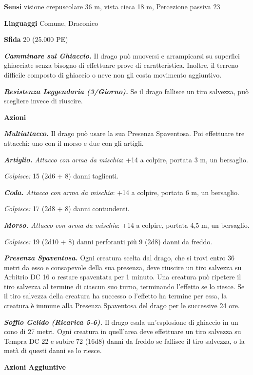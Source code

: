 \begin{multicols}{2}
\textbf{Sensi} visione crepuscolare 36 m, vista cieca 18 m, Percezione passiva
23

\textbf{Linguaggi} Comune, Draconico

\textbf{Sfida} 20 (25.000 PE)

\emph{\textbf{Camminare sul Ghiaccio.}} Il drago può muoversi e
arrampicarsi su superfici ghiacciate senza bisogno di effettuare prove
di caratteristica. Inoltre, il terreno difficile composto di ghiaccio o
neve non gli costa movimento aggiuntivo.

\emph{\textbf{Resistenza Leggendaria (3/Giorno).}} Se il drago fallisce
un tiro salvezza, può scegliere invece di riuscire.

\textbf{Azioni}

\emph{\textbf{Multiattacco.}} Il drago può usare la sua Presenza
Spaventosa. Poi effettuare tre attacchi: uno con il morso e due con gli
artigli.

\emph{\textbf{Artiglio.} Attacco con arma da mischia}: +14 a colpire,
portata 3 m, un bersaglio.

\emph{Colpisce:} 15 (2d6 + 8) danni taglienti.

\emph{\textbf{Coda.} Attacco con arma da mischia}: +14 a colpire,
portata 6 m, un bersaglio.

\emph{Colpisce:} 17 (2d8 + 8) danni contundenti.

\emph{\textbf{Morso.} Attacco con arma da mischia}: +14 a colpire,
portata 4,5 m, un bersaglio.

\emph{Colpisce:} 19 (2d10 + 8) danni perforanti più 9 (2d8) danni da
freddo.

\emph{\textbf{Presenza Spaventosa.}} Ogni creatura scelta dal drago, che
si trovi entro 36 metri da esso e consapevole della sua presenza, deve
riuscire un tiro salvezza su Arbitrio DC 16 o restare spaventata per 1
minuto. Una creatura può ripetere il tiro salvezza al termine di ciascun
suo turno, terminando l'effetto se lo riesce. Se il tiro salvezza della
creatura ha successo o l'effetto ha termine per essa, la creatura è
immune alla Presenza Spaventosa del drago per le successive 24 ore.

\emph{\textbf{Soffio Gelido (Ricarica 5-6).}} Il drago esala
un'esplosione di ghiaccio in un cono di 27 metri. Ogni creatura in
quell'area deve effettuare un tiro salvezza su Tempra DC 22 e
subire 72 (16d8) danni da freddo se fallisce il tiro salvezza, o la metà
di questi danni se lo riesce.

\textbf{Azioni Aggiuntive}


\end{multicols}
